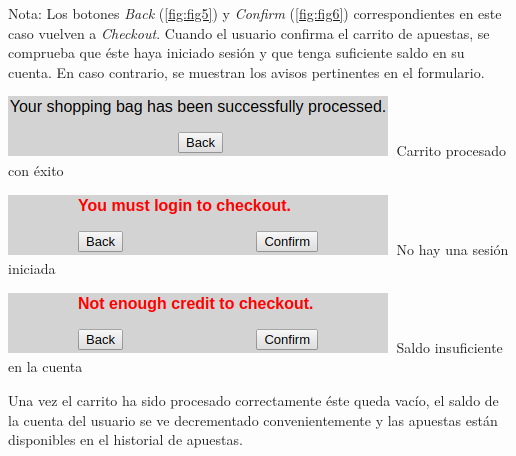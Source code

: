 \documentclass{article}
\newcommand{\cmark}{\ding{51}}
\newcommand{\xmark}{\ding{55}}
\begin{document}
\smallbreak
Nota: Los botones \textit{Back} (\autoref{fig:fig5}) y \textit{Confirm} (\autoref{fig:fig6}) correspondientes en este caso vuelven a \textit{Checkout}.
\bigbreak
Cuando el usuario confirma el carrito de apuestas, se comprueba que éste haya iniciado sesión y que tenga suficiente saldo en su cuenta. En caso contrario, se muestran los avisos pertinentes en el formulario.
\begin{multicols}{3}
    \begin{center}
        \includegraphics[width=.975\linewidth]{checkout4}
        \cmark$\;$Carrito procesado con éxito
    \end{center}
    \columnbreak
    \begin{center}
        \includegraphics[width=.975\linewidth]{checkout5}
        \xmark$\;$No hay una sesión iniciada
    \end{center}
    \columnbreak
    \begin{center}
        \includegraphics[width=.975\linewidth]{checkout6}
        \xmark$\;$Saldo insuficiente en la cuenta
    \end{center}
\end{multicols}
\bigbreak
Una vez el carrito ha sido procesado correctamente éste queda vacío, el saldo de la cuenta del usuario se ve decrementado convenientemente y las apuestas están disponibles en el historial de apuestas.
\newpage
\end{document}
